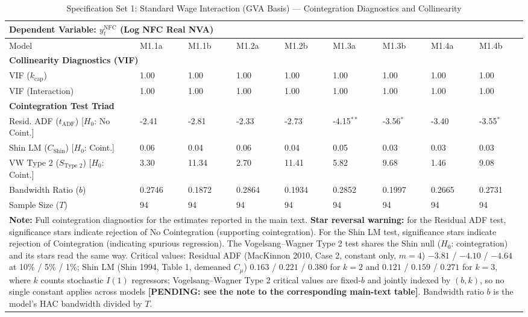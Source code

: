 \begin{table}[H]
\centering
\setlength{\tabcolsep}{2.5pt}
\caption{Specification Set 1: Standard Wage Interaction (GVA Basis) --- Cointegration Diagnostics and Collinearity}
\label{tab:specA_set1_gva_triad}
\scriptsize
\begin{tabular}{p{3.8cm}p{1.1cm}p{1.1cm}p{1.1cm}p{1.1cm}p{1.1cm}p{1.1cm}p{1.1cm}p{1.1cm}}
\toprule
\multicolumn{9}{l}{\textbf{Dependent Variable: $y_t^{\text{NFC}}$ (Log NFC Real NVA)}} \\
\midrule
Model & M1.1a & M1.1b & M1.2a & M1.2b & M1.3a & M1.3b & M1.4a & M1.4b \\
\midrule
\multicolumn{9}{l}{\textbf{Collinearity Diagnostics (VIF)}} \\
VIF ($k_{\text{cap}}$) & 1.00 & 1.00 & 1.00 & 1.00 & 1.00 & 1.00 & 1.00 & 1.00 \\
VIF (Interaction) & 1.00 & 1.00 & 1.00 & 1.00 & 1.00 & 1.00 & 1.00 & 1.00 \\
\midrule
\multicolumn{9}{l}{\textbf{Cointegration Test Triad}} \\
Resid. ADF ($t_{\text{ADF}}$) [$H_0$: No Coint.] & -2.41 & -2.81 & -2.33 & -2.73 & -4.15$^{**}$ & -3.56$^{*}$ & -3.40 & -3.55$^{*}$ \\
Shin LM ($C_{\text{Shin}}$) [$H_0$: Coint.] & 0.06 & 0.04 & 0.06 & 0.04 & 0.05 & 0.03 & 0.03 & 0.03 \\
VW Type 2 ($S_{\text{Type 2}}$) [$H_0$: Coint.] & 3.30 & 11.34 & 2.70 & 11.41 & 5.82 & 9.68 & 1.46 & 9.08 \\
\midrule
Bandwidth Ratio ($b$) & 0.2746 & 0.1872 & 0.2864 & 0.1934 & 0.2852 & 0.1997 & 0.2665 & 0.2731 \\
Sample Size ($T$) & 94 & 94 & 94 & 94 & 94 & 94 & 94 & 94 \\
\bottomrule
\multicolumn{9}{p{14.5cm}}{\footnotesize \textbf{Note:} Full cointegration diagnostics for the estimates reported in the main text. \textbf{Star reversal warning:} for the Residual ADF test, significance stars indicate rejection of No Cointegration (supporting cointegration). For the Shin LM test, significance stars indicate rejection of Cointegration (indicating spurious regression). The Vogelsang--Wagner Type 2 test shares the Shin null ($H_0$: cointegration) and its stars read the same way. Critical values: Residual ADF (MacKinnon 2010, Case 2, constant only, $m=4$) $-3.81$ / $-4.10$ / $-4.64$ at 10\% / 5\% / 1\%; Shin LM (Shin 1994, Table 1, demeaned $C_\mu$) $0.163$ / $0.221$ / $0.380$ for $k=2$ and $0.121$ / $0.159$ / $0.271$ for $k=3$, where $k$ counts stochastic $I(1)$ regressors; Vogelsang--Wagner Type 2 critical values are fixed-$b$ and jointly indexed by $(b, k)$, so no single constant applies across models \textbf{[PENDING: see the note to the corresponding main-text table]}. Bandwidth ratio $b$ is the model's HAC bandwidth divided by $T$.} \\
\end{tabular}
\end{table}
